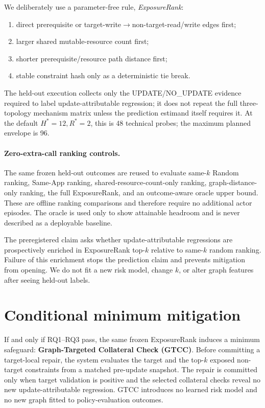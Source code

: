 \documentclass{article}
\begin{document}
We deliberately use a parameter-free rule, \emph{ExposureRank}:
\begin{enumerate}
 \item direct prerequisite or target-write$\rightarrow$non-target-read/write edges first;
 \item larger shared mutable-resource count first;
 \item shorter prerequisite/resource path distance first;
 \item stable constraint hash only as a deterministic tie break.
\end{enumerate}
The held-out execution collects only the UPDATE/NO\_UPDATE evidence required to label update-attributable regression; it does not repeat the full three-topology mechanism matrix unless the prediction estimand itself requires it. At the default $H^*=12,R^*=2$, this is 48 technical probes; the maximum planned envelope is 96.

\paragraph{Zero-extra-call ranking controls.}
The same frozen held-out outcomes are reused to evaluate same-$k$ Random ranking, Same-App ranking, shared-resource-count-only ranking, graph-distance-only ranking, the full ExposureRank, and an outcome-aware oracle upper bound. These are offline ranking comparisons and therefore require no additional actor episodes. The oracle is used only to show attainable headroom and is never described as a deployable baseline.

The preregistered claim asks whether update-attributable regressions are prospectively enriched in ExposureRank top-$k$ relative to same-$k$ random ranking. Failure of this enrichment stops the prediction claim and prevents mitigation from opening. We do not fit a new risk model, change $k$, or alter graph features after seeing held-out labels.

\section{Conditional minimum mitigation}
\label{sec:gtcc}
If and only if RQ1--RQ3 pass, the same frozen ExposureRank induces a minimum safeguard: \textbf{Graph-Targeted Collateral Check (GTCC)}. Before committing a target-local repair, the system evaluates the target and the top-$k$ exposed non-target constraints from a matched pre-update snapshot. The repair is committed only when target validation is positive and the selected collateral checks reveal no new update-attributable regression. GTCC introduces no learned risk model and no new graph fitted to policy-evaluation outcomes.
\end{document}
